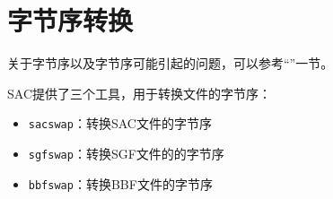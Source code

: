 \section{字节序转换}
\label{sec:bbfswap}
\label{sec:sacswap}
\label{sec:sgfswap}

关于字节序以及字节序可能引起的问题，可以参考``''一节。

SAC提供了三个工具，用于转换文件的字节序：
\begin{itemize}
\item \texttt{sacswap}：转换SAC文件的字节序
\item \texttt{sgfswap}：转换SGF文件的的字节序
\item \texttt{bbfswap}：转换BBF文件的字节序
\end{itemize}